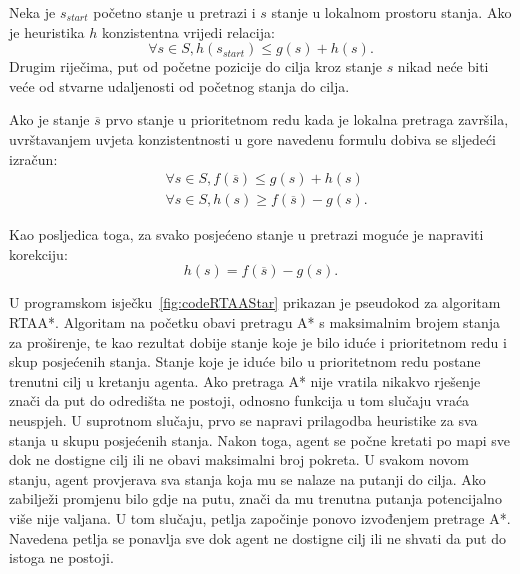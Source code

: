 \documentclass[times, utf8, zavrsni, numeric]{fer}
\begin{document}
\par Neka je \(s_{start}\) početno stanje u pretrazi i \(s\) stanje u lokalnom prostoru stanja. Ako je heuristika \(h\) konzistentna vrijedi relacija:
\begin{equation}
\forall s \in S, h(s_{start}) \leq g(s) + h(s).
\end{equation}
Drugim riječima, put od početne pozicije do cilja kroz stanje \(s\) nikad neće biti veće od stvarne udaljenosti od početnog stanja do cilja.

\par Ako je stanje \(\overline{s}\) prvo stanje u prioritetnom redu kada je lokalna pretraga završila, uvrštavanjem uvjeta konzistentnosti u gore navedenu formulu dobiva se sljedeći izračun:
\begin{equation}
\begin{aligned}
& \forall s \in S, f(\overline{s}) \leq g(s) + h(s)\\
& \forall s \in S, h(s) \geq f(\overline{s}) - g(s).
\end{aligned}
\end{equation}

\par Kao posljedica toga, za svako posjećeno stanje u pretrazi moguće je napraviti korekciju:
\begin{equation}
h(s) = f(\overline{s}) - g(s).
\end{equation}

\begin{minipage}{\textwidth}
	
\end{minipage}

U programskom isječku~\ref{fig:codeRTAAStar} prikazan je pseudokod za algoritam RTAA*. 
Algoritam na početku obavi pretragu A* s maksimalnim brojem stanja za proširenje, te kao rezultat dobije stanje koje je bilo iduće i prioritetnom redu i skup posjećenih stanja.
Stanje koje je iduće bilo u prioritetnom redu postane trenutni cilj u kretanju agenta.
Ako pretraga A* nije vratila nikakvo rješenje znači da put do odredišta ne postoji, odnosno funkcija u tom slučaju vraća neuspjeh.
U suprotnom slučaju, prvo se napravi prilagodba heuristike za sva stanja u skupu posjećenih stanja.
Nakon toga, agent se počne kretati po mapi sve dok ne dostigne cilj ili ne obavi maksimalni broj pokreta.
U svakom novom stanju, agent provjerava sva stanja koja mu se nalaze na putanji do cilja.
Ako zabilježi promjenu bilo gdje na putu, znači da mu trenutna putanja potencijalno više nije valjana. 
U tom slučaju, petlja započinje ponovo izvođenjem pretrage A*.
Navedena petlja se ponavlja sve dok agent ne dostigne cilj ili ne shvati da put do istoga ne postoji.
\end{document}
